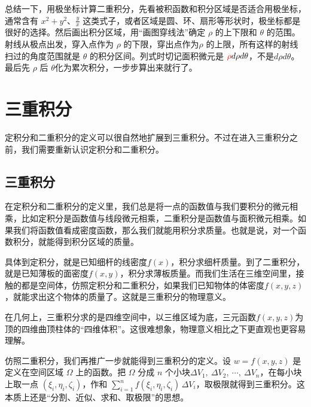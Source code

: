 总结一下，用极坐标计算二重积分，先看被积函数和积分区域是否适合用极坐标，通常含有 \(x^2+y^2\)、\(\frac{y}{x}\) 这类式子，或者区域是圆、环、扇形等形状时，极坐标都是很好的选择。然后画出积分区域，用“画图穿线法”确定 \(\rho\) 的上下限和 \(\theta\) 的范围。射线从极点出发，穿入点作为 \(\rho\) 的下限，穿出点作为\(\rho\) 的上限，所有这样的射线扫过的角度范围就是 \(\theta\) 的积分区间。列式时切记面积微元是 $\textcolor{red}{\rho}d\rho d\theta$，不是$d\rho d\theta$。最后先 \(\rho\) 后 \(\theta\)化为累次积分，一步步算出来就行了。

\section{三重积分}
定积分和二重积分的定义可以很自然地扩展到三重积分。不过在进入三重积分之前，我们需要重新认识定积分和二重积分。
\subsection{三重积分}

在定积分和二重积分的定义里，我们总是将一点的函数值与我们要积分的微元相乘，比如定积分是函数值与线段微元相乘，二重积分是函数值与面积微元相乘。如果我们将函数值看成密度函数，那么我们就能用积分求质量。也就是说，对一个函数积分，就能得到积分区域的质量。

具体到定积分，就是已知细杆的线密度$f(x)$，积分求细杆质量。到了二重积分，就是已知薄板的面密度$f(x,y)$，积分求薄板质量。而我们生活在三维空间里，接触的都是空间体，仿照定积分和二重积分，如果我们已知物体的体密度$f(x,y,z)$，就能求出这个物体的质量了。这就是三重积分的物理意义。

在几何上，三重积分求的是四维空间中，以三维区域为底，三元函数$f(x,y,z)$为顶的四维曲顶柱体的“四维体积”。这很难想象，物理意义相比之下更直观也更容易理解。

仿照二重积分，我们再推广一步就能得到三重积分的定义。设 $w = f(x, y, z)$ 是定义在空间区域 $\Omega$ 上的函数。把 $\Omega$ 分成 $n$ 个小块$\Delta V_1,\ \Delta V_2,\ \cdots,\ \Delta V_n$，在每小块上取一点 $(\xi_i, \eta_i, \zeta_i)$，作和 $\sum_{i=1}^n f(\xi_i, \eta_i, \zeta_i)\, \Delta V_i$，取极限就得到三重积分。这本质上还是“分割、近似、求和、取极限”的思想。

